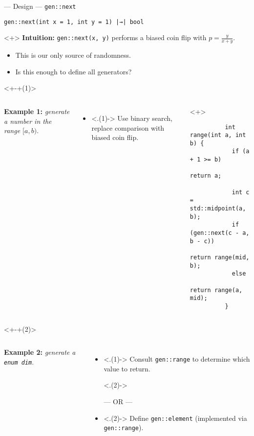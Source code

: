 \begin{frame}[fragile,t]{\halcheck{} --- Design --- \texttt{gen::next}}
  \begin{center}
    \texttt{gen::next(int x = 1, int y = 1) |→| bool}
  \end{center}

  \begin{onlyenv}<+>
    \textbf{Intuition:} \texttt{gen::next(x, y)} performs a biased coin flip with \( p = \frac{y}{x + y} \).

    \begin{itemize}
      \item This is our \alert{only} source of randomness.
      \item Is this enough to define all generators?
    \end{itemize}
  \end{onlyenv}

  \begin{onlyenv}<+-+(1)>
    \begin{columns}[T]
      \textbf{Example 1:} \emph{generate a number in the range $[a, b)$}.

      \begin{itemize}
        \item<.(1)-> Use binary search, replace comparison with biased coin flip.
      \end{itemize}

      \begin{onlyenv}<+>
        \begin{verbatim}
          int range(int a, int b) {
            if (a + 1 >= b)
              return a;

            int c = std::midpoint(a, b);
            if (gen::next(c - a, b - c))
              return range(mid, b);
            else
              return range(a, mid);
          }
        \end{verbatim}
      \end{onlyenv}
    \end{columns}
  \end{onlyenv}

  \begin{onlyenv}<+-+(2)>
    \begin{columns}[T]
      \textbf{Example 2:} \emph{generate a \texttt{enum dim}}.

      \begin{itemize}
        \item<.(1)-> Consult \texttt{gen::range} to determine which value to return.
          \begin{onlyenv}<.(2)->
            \begin{center}
              --- OR ---
            \end{center}
          \end{onlyenv}
        \item<.(2)-> Define \texttt{gen::element} (implemented via \texttt{gen::range}).
      \end{itemize}


\end{columns}
\end{onlyenv}
\end{frame}
